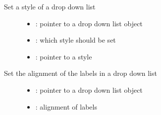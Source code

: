 \documentclass[letterpaper,10pt,english]{sphinxmanual}
\begin{document}

\begin{fulllineitems}
\label{\detokenize{object-types/ddlist:_CPPv419lv_ddlist_set_styleP8lv_obj_t17lv_ddlist_style_tPK10lv_style_t}}%
\pysigstartmultiline
{}\label{\detokenize{object-types/ddlist:lv__ddlist_8h_1a21b964a4bc181844299d9c81b3838778}}%
\pysigstopmultiline
Set a style of a drop down list \begin{description}
\item[{}] \leavevmode\begin{itemize}
\item {} 
: pointer to a drop down list object 

\item {} 
: which style should be set 

\item {} 
: pointer to a style 

\end{itemize}

\end{description}


\end{fulllineitems}


\begin{fulllineitems}
\label{\detokenize{object-types/ddlist:_CPPv419lv_ddlist_set_alignP8lv_obj_t16lv_label_align_t}}%
\pysigstartmultiline
{}\label{\detokenize{object-types/ddlist:lv__ddlist_8h_1a0920951e078f907637363201b16fef4f}}%
\pysigstopmultiline
Set the alignment of the labels in a drop down list \begin{description}
\item[{}] \leavevmode\begin{itemize}
\item {} 
: pointer to a drop down list object 

\item {} 
: alignment of labels 

\end{itemize}

\end{description}


\end{fulllineitems}
\end{document}
